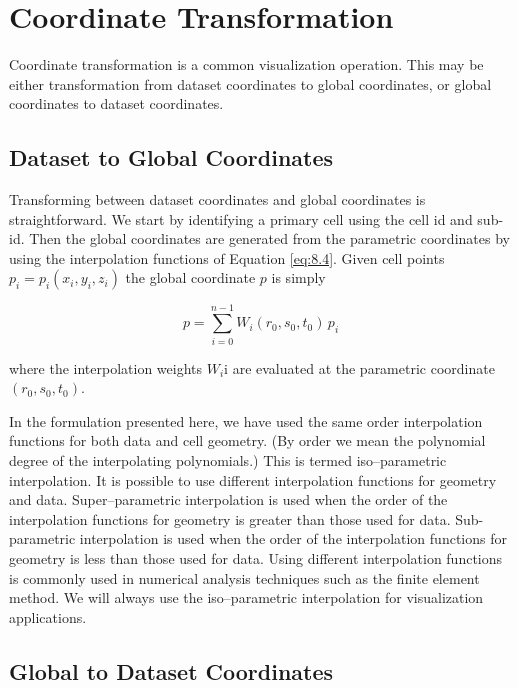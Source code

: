 \section{Coordinate Transformation}

Coordinate transformation is a common visualization operation. This may be either transformation from dataset coordinates to global coordinates, or global coordinates to dataset coordinates.

\subsection{Dataset to Global Coordinates}

Transforming between dataset coordinates and global coordinates is straightforward. We start by identifying a primary cell using the cell id and sub-id. Then the global coordinates are generated from the parametric coordinates by using the interpolation functions of Equation \ref{eq:8.4}. Given cell points $p_i = p_i(x_i, y_i, z_i)$ the global coordinate $p$ is simply

\begin{equation}\label{eq:8.8}
p = \sum_{i = 0}^{n - 1} W_i(r_0, s_0, t_0)\, p_i
\end{equation}

where the interpolation weights $W_i$i are evaluated at the parametric coordinate $(r_0, s_0, t_0)$.

In the formulation presented here, we have used the same order interpolation functions for both data and cell geometry. (By order we mean the polynomial degree of the interpolating polynomials.) This is termed iso--parametric interpolation. It is possible to use different interpolation functions for geometry and data. Super--parametric interpolation is used when the order of the interpolation functions for geometry is greater than those used for data. Sub-parametric interpolation is used when the order of the interpolation functions for geometry is less than those used for data. Using different interpolation functions is commonly used in numerical analysis techniques such as the finite element method. We will always use the iso--parametric interpolation for visualization applications.

\subsection{Global to Dataset Coordinates}

